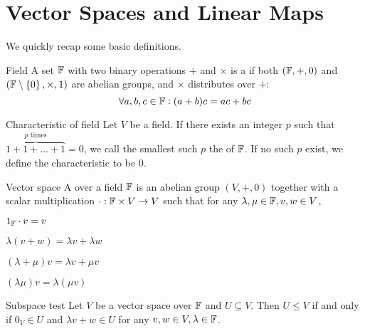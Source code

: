 \documentclass{styles/tufte}
\author{Jiaming (George) Yu}
\date{\today}
\begin{document}
\maketitle
\tableofcontents
\newpage



\setcounter{section}{-1}
\section{Vector Spaces and Linear Maps}

We quickly recap some basic definitions.

\begin{definition}{Field}{}
  A set $\mathbb{F}$ with two binary operations $+$ and $\times$ is a  if both $(\mathbb{F}, +, 0)$ and $(\mathbb{F} \setminus \set{0}, \times, 1)$ are abelian groups, and $\times$ distributes over $+$:
  \[ \forall a, b, c \in \mathbb{F}: (a + b)c = ac + bc \]
\end{definition}

\begin{definition}{Characteristic of field}{}
  Let $V$ be a field. If there exists an integer $p$ such that $\overbrace{1 + 1 + \dots + 1}^{p \text{ times}} = 0$, we call the smallest such $p$ the  of $\mathbb{F}$. If no such $p$ exist, we define the characteristic to be 0.
\end{definition}

\begin{definition}{Vector space}{}
  A  over a field $\mathbb{F}$ is an abelian group $(V, +, 0)$ together with a scalar multiplication $\cdot: \mathbb{F} \times V \to V$ such that for any $\lambda, \mu \in \mathbb{F}, v, w \in V$,
  \begin{romanenum}
    \item $1_{\mathbb{F}} \cdot v = v$
    \item $\lambda(v + w) = \lambda v + \lambda w$
    \item $(\lambda + \mu) v = \lambda v + \mu v$
    \item $(\lambda \mu) v = \lambda (\mu v)$
  \end{romanenum}
\end{definition}

\begin{proposition}{Subspace test}{}
  Let $V$ be a vector space over $\mathbb{F}$ and $U \subseteq V$. Then $U \leqslant V$ if and only if $0_V \in U$ and $\lambda v + w \in U$ for any $v, w \in V, \lambda \in \mathbb{F}$.
\end{proposition}
\end{document}
